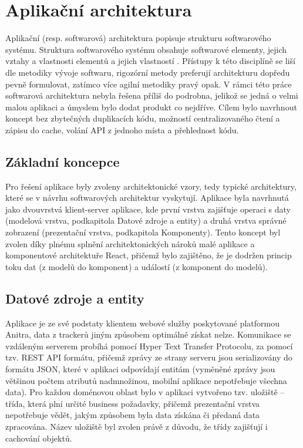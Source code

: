 \section{Aplikační architektura}


Aplikační (resp. softwarová) architektura popisuje strukturu softwarového systému. Struktura softwarového systému obsahuje softwarové elementy, jejich vztahy a vlastnosti elementů a jejich vlastností \cite{clements2010documenting}. Přístupy k této disciplíně se liší dle metodiky vývoje softwaru, rigozórní metody preferují architekturu dopředu pevně formulovat, zatímco více agilní metodiky pravý opak. V rámci této práce softwarová architektura nebyla řešena příliš do podrobna, jelikož se jedná o velmi malou aplikaci a úmyslem bylo dodat produkt co nejdříve. Cílem bylo navrhnout koncept bez zbytečných duplikacích kódu, možností centralizovaného čtení a zápisu do cache, volání API z jednoho místa a přehlednost kódu.

\subsection{Základní koncepce}

Pro řešení aplikace byly zvoleny architektonické vzory, tedy typické architektury, které se v návrhu softwarových architektur vyskytují. Aplikace byla navrhnutá jako dvouvrstvá klient-server aplikace, kde první vrstva zajišťuje operaci s daty (modelová vrstva, podkapitola Datové zdroje a entity) a druhá vrstva správné zobrazení (prezentační vrstva, podkapitola Komponenty). Tento koncept byl zvolen díky plnému splnění architektonických nároků malé aplikace a komponentové architektuře React, přičemž bylo zajištěno, že je dodržen princip toku dat (z modelů do komponent) a událostí (z komponent do modelů). 

\subsection{Datové zdroje a entity}

Aplikace je ze své podstaty klientem webové služby poskytované platformou Anitra, data z trackerů jiným způsobem optimálně získat nelze. Komunikace se vzdáleným serverem probíhá pomocí Hyper Text Transfer Protocolu, za pomocí tzv. REST API formátu, přičemž zprávy ze strany serveru jsou serializovány do formátu JSON, které v aplikaci odpovídají entitám (vyměněné zprávy jsou většinou počtem atributů nadmnožinou, mobilní aplikace nepotřebuje všechna data). Pro každou doménovou oblast bylo v aplikaci vytvořeno tzv. uložiště -- třída, která plní určité business požadavky, přičemž prezentační vrstva nepotřebuje vědět, jakým způsobem byla data získána či předaná data zpracována. Název uložiště byl zvolen právě z důvodu, že třídy zajišťují i cachování objektů.

